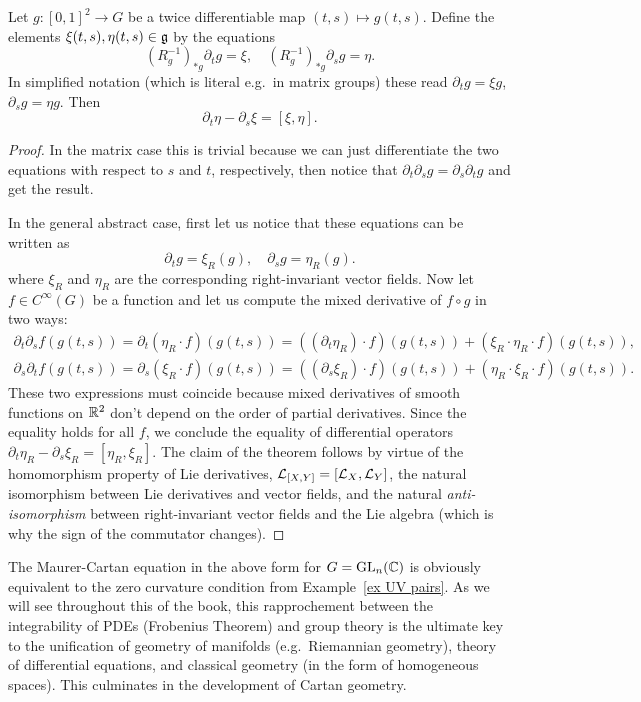 \begin{prop}
    Let $g:[0,1]^2\to G$ be a twice differentiable map $(t,s)\mapsto g(t,s)$. Define the elements $\xi(t,s),\eta(t,s)\in\mathfrak{g}$ by the equations
    \[(R_{g}^{-1})_{\ast g}\partial_t g=\xi, \quad (R_{g}^{-1})_{\ast g}\partial_s g=\eta.\]
    In simplified notation (which is literal e.g.~in matrix groups) these read $\partial_t g=\xi g$, $\partial_s g=\eta g$. Then 
    \[\partial_t \eta-\partial_s \xi =[\xi,\eta].\label{eq Maurer-Cartan}\]
\end{prop}
\begin{proof}
    In the matrix case this is trivial because we can just differentiate the two equations with respect to $s$ and $t$, respectively, then notice that $\partial_t\partial_s g=\partial_s\partial_t g$ and get the result.

    In the general abstract case, first let us notice that these equations can be written as
    \[\partial_t g=\xi_R(g),\quad \partial_s g=\eta_R(g).\]
    where $\xi_R$ and $\eta_R$ are the corresponding right-invariant vector fields. Now let $f\in C^\infty(G)$ be a function and let us compute the mixed derivative of $f\circ g$ in two ways:
    \begin{gather}
        \partial_t\partial_s f(g(t,s))=\partial_t (\eta_R\cdot f)(g(t,s))=((\partial_t\eta_R)\cdot f)(g(t,s))+(\xi_R\cdot \eta_R\cdot f)(g(t,s)),\\
        \partial_s\partial_t f(g(t,s))=\partial_s (\xi_R\cdot f)(g(t,s))=((\partial_s\xi_R)\cdot f)(g(t,s))+(\eta_R\cdot \xi_R\cdot f)(g(t,s)).
    \end{gather}
    These two expressions must coincide because mixed derivatives of smooth functions on $\mathbb{R}^2$ don't depend on the order of partial derivatives. Since the equality holds for all $f$, we conclude the equality of differential operators $\partial_t\eta_R-\partial_s\xi_R=[\eta_R,\xi_R]$. The claim of the theorem follows by virtue of the homomorphism property of Lie derivatives, $\mathcal{L}_{[X,Y]}=[\mathcal{L}_X,\mathcal{L}_Y]$, the natural isomorphism between Lie derivatives and vector fields, and the natural \emph{anti-isomorphism} between right-invariant vector fields and the Lie algebra (which is why the sign of the commutator changes).
\end{proof}

\begin{rem}
    The Maurer-Cartan equation in the above form for $G=\operatorname{GL}_n(\mathbb{C})$ is obviously equivalent to the zero curvature condition from Example~\ref{ex UV pairs}. As we will see throughout this \partt{} of the book, this rapprochement between the integrability of PDEs (Frobenius Theorem) and group theory is the ultimate key to the unification of geometry of manifolds (e.g.\ Riemannian geometry), theory of differential equations, and classical geometry (in the form of homogeneous spaces). This culminates in the development of Cartan geometry.
\end{rem}






